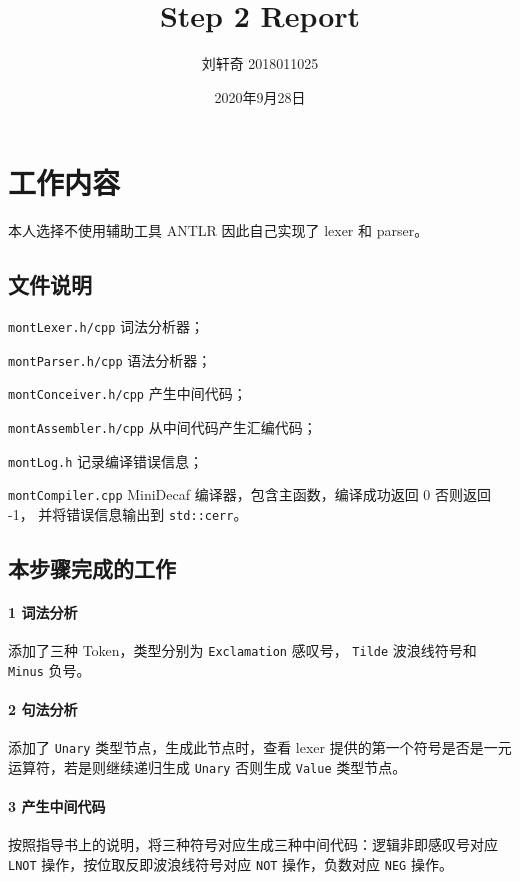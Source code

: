 \documentclass[UTF8]{ctexart}
\title{Step 2 Report}
\author{刘轩奇 2018011025}
\date{2020年9月28日}
\newcommand{\T}[1]{\texttt{{#1}}}
\begin{document}
    \maketitle
    \section{工作内容}
        本人选择不使用辅助工具 ANTLR 因此自己实现了 lexer 和 parser。
        \subsection{文件说明} 
            \T{montLexer.h/cpp} 词法分析器；

            \T{montParser.h/cpp} 语法分析器；

            \T{montConceiver.h/cpp} 产生中间代码；

            \T{montAssembler.h/cpp} 从中间代码产生汇编代码；
            
            \T{montLog.h} 记录编译错误信息；

            \T{montCompiler.cpp} MiniDecaf 编译器，包含主函数，编译成功返回 0 否则返回 -1，
            并将错误信息输出到 \T{std::cerr}。
        
        \subsection{本步骤完成的工作}

            \paragraph{1 词法分析} 添加了三种 Token，类型分别为 \T{Exclamation} 感叹号，
            \T{Tilde} 波浪线符号和 \T{Minus} 负号。

            \paragraph{2 句法分析} 添加了 \T{Unary} 类型节点，生成此节点时，查看 lexer
            提供的第一个符号是否是一元运算符，若是则继续递归生成 \T{Unary} 否则生成
            \T{Value} 类型节点。

            \paragraph{3 产生中间代码} 
            按照指导书上的说明，将三种符号对应生成三种中间代码：逻辑非即感叹号对应
            \T{LNOT} 操作，按位取反即波浪线符号对应 \T{NOT} 操作，负数对应 \T{NEG} 操作。
\end{document}
